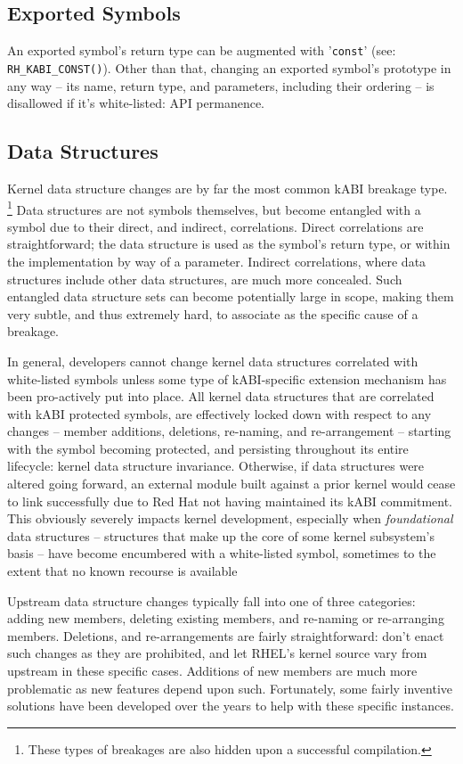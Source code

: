\documentclass[10pt,oneside,english]{book}
\begin{document}
\subsection{Exported Symbols}

An exported symbol's return type can be augmented with '\texttt{const}'
(see: \texttt{RH\_KABI\_CONST()}). Other than that, changing an exported
symbol's prototype in any way -- its name, return type, and parameters,
including their ordering -- is disallowed if it's white-listed: API
permanence.

\subsection{Data Structures}

Kernel data structure changes are by far the most common kABI breakage
type. \footnote{These types of breakages are also hidden upon a successful compilation.}
Data structures are not symbols themselves, but become entangled with
a symbol due to their direct, and indirect, correlations. Direct correlations
are straightforward; the data structure is used as the symbol's return
type, or within the implementation by way of a parameter. Indirect
correlations, where data structures include other data structures,
are much more concealed. Such entangled data structure sets can become
potentially large in scope, making them very subtle, and thus extremely
hard, to associate as the specific cause of a breakage.

In general, developers cannot change kernel data structures correlated
with white-listed symbols unless some type of kABI-specific extension
mechanism has been pro-actively put into place. All kernel data structures
that are correlated with kABI protected symbols, are effectively locked
down with respect to any changes -- member additions, deletions,
re-naming, and re-arrangement -- starting with the symbol becoming
protected, and persisting throughout its entire lifecycle: kernel
data structure invariance. Otherwise, if data structures were altered
going forward, an external module built against a prior kernel would
cease to link successfully due to Red Hat not having maintained its
kABI commitment. This obviously severely impacts kernel development,
especially when \emph{foundational} data structures -- structures
that make up the core of some kernel subsystem's basis -- have become
encumbered with a white-listed symbol, sometimes to the extent that
no known recourse is available

Upstream data structure changes typically fall into one of three categories:
adding new members, deleting existing members, and re-naming or re-arranging
members. Deletions, and re-arrangements are fairly straightforward:
don't enact such changes as they are prohibited, and let RHEL's kernel
source vary from upstream in these specific cases. Additions of new
members are much more problematic as new features depend upon such.
Fortunately, some fairly inventive solutions have been developed over
the years to help with these specific instances.
\end{document}
